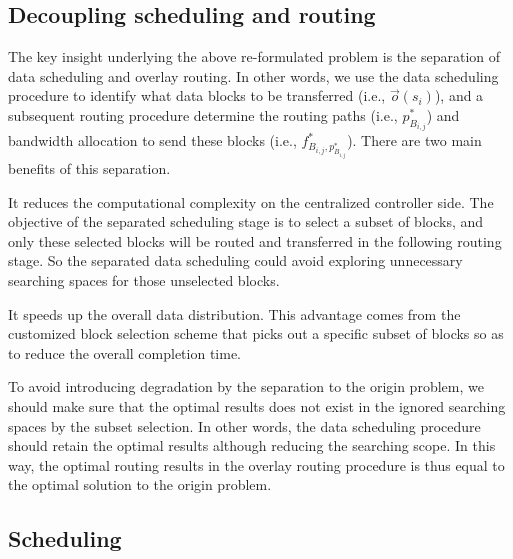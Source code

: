 \subsection{Decoupling scheduling and routing}
\label{subsec:logic:separation}

The key insight underlying the above re-formulated problem is the
separation of data scheduling and overlay routing.
In other words, we use the data scheduling procedure to identify
what data blocks to be transferred
(i.e., $\overrightarrow{o}(s_i)$),
and a subsequent routing procedure determine the routing paths
(i.e., $p_{B_{i,j}}^*$)
and bandwidth allocation to send these blocks
(i.e., $f^*_{B_{i,j},p_{B_{i,j}}^*}$).
There are two main benefits of this separation.
\begin{packedenumerate}
\item It reduces the computational complexity on the centralized controller side. The objective of the separated scheduling stage is to select a subset of blocks, and only these selected blocks will be routed and transferred in the following routing stage. So the separated data scheduling could avoid exploring unnecessary searching spaces for those unselected blocks.
\item It speeds up the overall data distribution. This advantage comes from the customized block selection scheme that picks out a specific subset of blocks so as to reduce the overall completion time.
\end{packedenumerate}

To avoid introducing degradation by the separation to the origin problem, we should make sure that the optimal results does not exist in the ignored searching spaces by the subset selection. In other words, the data scheduling procedure should retain the optimal results although reducing the searching scope. In this way, the optimal routing results in the overlay routing procedure is thus equal to the optimal solution to the origin problem.

\subsection{Scheduling}
\label{subsec:logic:scheduling}

